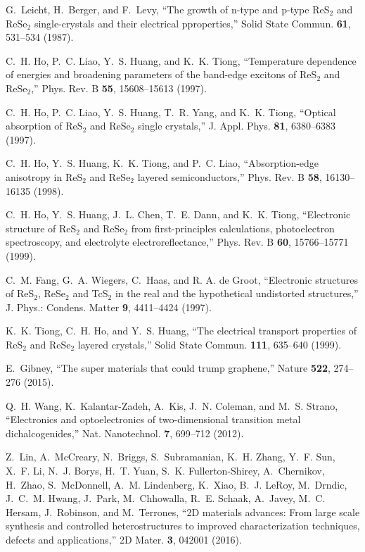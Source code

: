 \documentclass{osa-article}
\begin{document}
\begin{thebibliography}{1}
\newcommand{\enquote}[1]{``#1''}

G.~Leicht, H.~Berger, and F.~Levy, \enquote{The growth of n-type and p-type
  {ReS$_2$} and {ReSe$_2$} single-crystals and their electrical pproperties,}
  Solid State Commun. \textbf{61}, 531--534 (1987).

C.~H. Ho, P.~C. Liao, Y.~S. Huang, and K.~K. Tiong, \enquote{Temperature
  dependence of energies and broadening parameters of the band-edge excitons of
  {ReS$_2$ and ReSe$_2$},} Phys. Rev. B \textbf{55}, 15608--15613 (1997).

C.~H. Ho, P.~C. Liao, Y.~S. Huang, T.~R. Yang, and K.~K. Tiong,
  \enquote{Optical absorption of {ReS$_2$ and ReSe$_2$} single crystals,} J.
  Appl. Phys. \textbf{81}, 6380--6383 (1997).

C.~H. Ho, Y.~S. Huang, K.~K. Tiong, and P.~C. Liao, \enquote{Absorption-edge
  anisotropy in {ReS$_2$} and {ReSe$_2$} layered semiconductors,} Phys. Rev. B
  \textbf{58}, 16130--16135 (1998).

C.~H. Ho, Y.~S. Huang, J.~L. Chen, T.~E. Dann, and K.~K. Tiong,
  \enquote{Electronic structure of {ReS$_2$ and ReSe$_2$} from first-principles
  calculations, photoelectron spectroscopy, and electrolyte
  electroreflectance,} Phys. Rev. B \textbf{60}, 15766--15771 (1999).

C.~M. Fang, G.~A. Wiegers, C.~Haas, and {R. A. de Groot}, \enquote{Electronic
  structures of {ReS$_2$, ReSe$_2$ and TcS$_2$} in the real and the
  hypothetical undistorted structures,} J. Phys.: Condens. Matter \textbf{9},
  4411--4424 (1997).

K.~K. Tiong, C.~H. Ho, and Y.~S. Huang, \enquote{The electrical transport
  properties of {ReS$_2$ and ReSe$_2$} layered crystals,} Solid State Commun.
  \textbf{111}, 635--640 (1999).

E.~Gibney, \enquote{The super materials that could trump graphene,} Nature
  \textbf{522}, 274--276 (2015).

Q.~H. Wang, K.~Kalantar-Zadeh, A.~Kis, J.~N. Coleman, and M.~S. Strano,
  \enquote{Electronics and optoelectronics of two-dimensional transition metal
  dichalcogenides,} Nat. Nanotechnol. \textbf{7}, 699--712 (2012).

Z.~Lin, A.~McCreary, N.~Briggs, S.~Subramanian, K.~H. Zhang, Y.~F. Sun, X.~F.
  Li, N.~J. Borys, H.~T. Yuan, S.~K. Fullerton-Shirey, A.~Chernikov, H.~Zhao,
  S.~McDonnell, A.~M. Lindenberg, K.~Xiao, B.~J. LeRoy, M.~Drndic, J.~C.~M.
  Hwang, J.~Park, M.~Chhowalla, R.~E. Schaak, A.~Javey, M.~C. Hersam,
  J.~Robinson, and M.~Terrones, \enquote{{2D} materials advances: From large
  scale synthesis and controlled heterostructures to improved characterization
  techniques, defects and applications,} 2D Mater. \textbf{3}, 042001 (2016).


\end{thebibliography}
\end{document}
